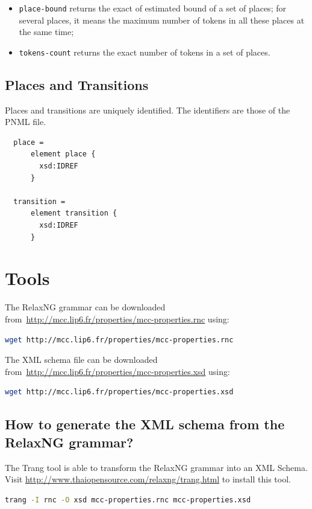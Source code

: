 \documentclass[10pt,english,a4paper]{article}
\begin{document}
\begin{itemize}
  \item \lstinline!place-bound! returns the exact of estimated bound of a set of places;
    for several places, it means the maximum number of tokens in all these places at the same
    time;
  \item \lstinline!tokens-count! returns the exact number of tokens in a set of places.
\end{itemize}

\subsection{Places and Transitions}

Places and transitions are uniquely identified. The identifiers are those of the PNML file.

\begin{lstlisting}
  place =
      element place {
        xsd:IDREF
      }

  transition =
      element transition {
        xsd:IDREF
      }
\end{lstlisting}




\section{Tools}
The RelaxNG grammar can be downloaded from~\url{http://mcc.lip6.fr/properties/mcc-properties.rnc} using:
\begin{lstlisting}[language=sh]
  wget http://mcc.lip6.fr/properties/mcc-properties.rnc
\end{lstlisting}

The XML schema file can be downloaded from~\url{http://mcc.lip6.fr/properties/mcc-properties.xsd} using:
\begin{lstlisting}[language=sh]
  wget http://mcc.lip6.fr/properties/mcc-properties.xsd
\end{lstlisting}

\subsection{How to generate the XML schema from the RelaxNG grammar?}
The Trang tool is able to transform the RelaxNG grammar into an XML Schema.
Visit \url{http://www.thaiopensource.com/relaxng/trang.html} to install this tool.

\begin{lstlisting}[language=sh]
  trang -I rnc -O xsd mcc-properties.rnc mcc-properties.xsd
\end{lstlisting}
\end{document}
